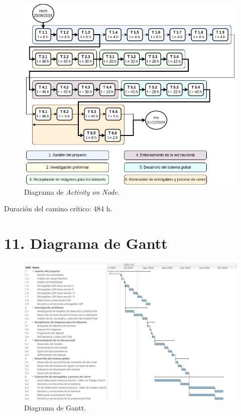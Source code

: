 \documentclass[
11pt %
]{charter}
\begin{document}
\begin{figure}[htpb]
\centering 
\includegraphics[width=.8\textwidth]{./Figuras/AoN.png}
\caption{Diagrama de \textit{Activity on Node}.}
\label{fig:AoN}
\end{figure}

Duración del camino crítico: 484 h.

\section{11. Diagrama de Gantt}
\label{sec:gantt}

\begin{landscape}
\begin{figure}[htpb]
\centering 
\includegraphics[height=.85\textheight]{./Figuras/Gantt.png}
\caption{Diagrama de Gantt.} %
\label{fig:diagGantt}
\end{figure}

\end{landscape}
\end{document}
